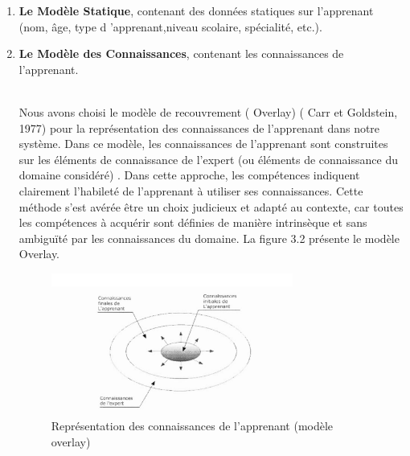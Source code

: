 \begin{enumerate}
\item  \textbf{Le Modèle Statique}, contenant des données statiques sur l'apprenant (nom, âge, type d 'apprenant,niveau scolaire, spécialité,  etc.).
\item  \textbf{Le Modèle des Connaissances}, contenant les connaissances de l'apprenant.\\\

Nous avons choisi le modèle de recouvrement ( Overlay) ( Carr et Goldstein, 1977) pour la représentation des connaissances de l'apprenant dans notre système. Dans ce modèle, les connaissances de l'apprenant sont construites sur les éléments de connaissance de l'expert (ou éléments de connaissance du domaine considéré) . Dans cette approche, les compétences indiquent clairement l'habileté de l'apprenant à utiliser ses connaissances. Cette méthode s'est avérée être un choix judicieux et adapté au contexte, car toutes les compétences à acquérir sont définies de manière intrinsèque et sans ambiguïté par les connaissances du domaine. La figure 3.2 présente le modèle Overlay. 

\begin{figure}
    \centering
    \includegraphics[width=0.75\textwidth]{figures/con1.PNG}
    \captionsetup{justification=centering}
    \caption{Représentation des connaissances de l'apprenant (modèle overlay)}
 \label{fig:2}
\end{figure}
\\\


\end{enumerate}
